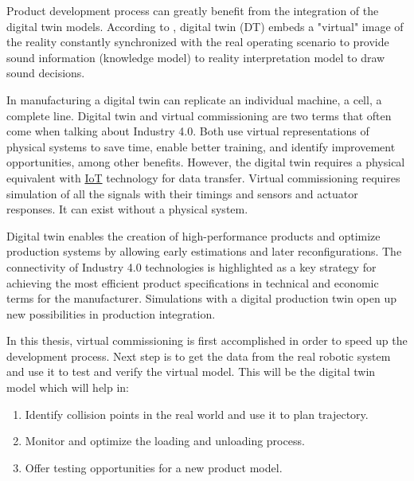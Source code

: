 

Product development process can greatly benefit from the integration of
the digital twin models. According to \cite{SEMERARO2021103469}, digital twin (DT) embeds a "virtual" image of the reality
constantly synchronized with the real operating scenario to provide sound information (knowledge model) to reality interpretation model to draw sound decisions.

In manufacturing a digital twin can replicate an individual machine, a cell, a complete line. Digital twin and virtual commissioning are two terms that often come when
talking about Industry 4.0. Both use virtual representations of physical systems to save time, enable better training, and identify improvement opportunities, among other benefits. However, the digital twin requires a physical equivalent with \hyperref[tab:acronyms]{IoT} technology for data transfer. Virtual commissioning requires simulation of all the signals with their timings and sensors and actuator responses.
It can exist without a physical system. \cite{digitaltwinblog}

Digital twin enables the creation of high-performance products and optimize production systems by allowing early estimations and later reconfigurations. The connectivity of Industry 4.0 technologies is highlighted as a key strategy for achieving the most efficient product specifications in technical and economic terms for the manufacturer. 
Simulations with a digital production twin open up new possibilities in production integration.
\cite{WAGNER201988}


In this thesis, virtual commissioning is first accomplished in order to speed up the development process. Next step is to get the data from the real robotic system and use it to test and verify the virtual model.
This will be the digital twin model which will help in:
\begin{enumerate}
    \item Identify collision points in the real world and use it to plan trajectory.
    \item Monitor and optimize the loading and unloading process.
    \item Offer testing opportunities for a new product model.
\end{enumerate}

